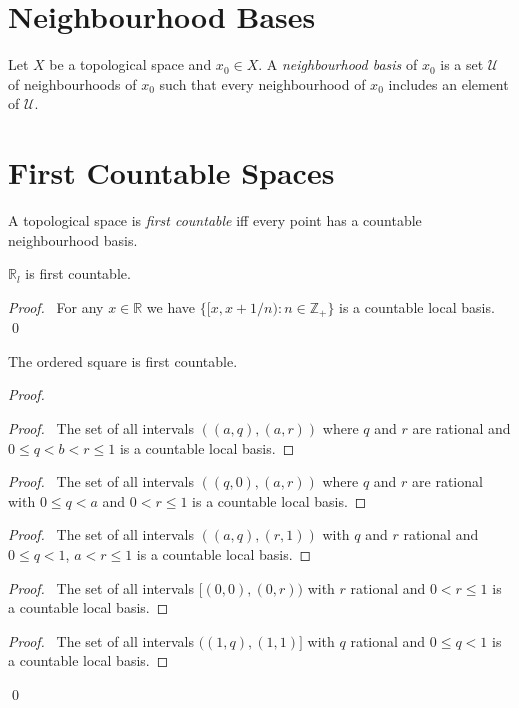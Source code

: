 \section{Neighbourhood Bases}

\begin{df}
Let $X$ be a topological space and $x_0 \in X$. A \emph{neighbourhood basis} of $x_0$ is a set $\mathcal{U}$ of neighbourhoods of $x_0$ such that every neighbourhood of $x_0$ includes an element of $\mathcal{U}$.
\end{df}

\section{First Countable Spaces}

\begin{df}
A topological space is \emph{first countable} iff every point has a countable neighbourhood basis.
\end{df}

\begin{prop}
$\mathbb{R}_l$ is first countable.
\end{prop}

\begin{proof}
\pf\ For any $x \in \mathbb{R}$ we have $\{ [x, x + 1/n) : n \in \mathbb{Z}_+ \}$ is a countable local basis. \qed
\end{proof}

\begin{prop}
The ordered square is first countable.
\end{prop}

\begin{proof}
\pf
{}
\begin{proof}
	\pf\ The set of all intervals $((a,q),(a,r))$ where $q$ and $r$ are rational and $0 \leq q < b < r \leq 1$ is a countable local basis.
\end{proof}
\begin{proof}
	\pf\ The set of all intervals $((q,0),(a,r))$ where $q$ and $r$ are rational with $0 \leq q < a$ and $0 < r \leq 1$ is a countable local basis.
\end{proof}
\begin{proof}
	\pf\ The set of all intervals $((a,q),(r,1))$ with $q$ and $r$ rational and $0 \leq q < 1$, $a < r \leq 1$ is a countable local basis.
\end{proof}
\begin{proof}
	\pf\ The set of all intervals $[(0,0),(0,r))$ with $r$ rational and $0 < r \leq 1$ is a countable local basis.
\end{proof}
\begin{proof}
	\pf\ The set of all intervals $((1,q),(1,1)]$ with $q$ rational and $0 \leq q < 1$ is a countable local basis.
\end{proof}
\qed
\end{proof}
